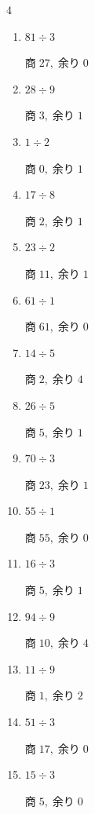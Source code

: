 \begin{multicols}{4}
\begin{enumerate}
        $商\; 1,\; 余り\; 8$

  \item $81 \div 3$

        $商\; 27,\; 余り\; 0$

  \item $28 \div 9$

        $商\; 3,\; 余り\; 1$

  \item $1 \div 2$

        $商\; 0,\; 余り\; 1$

  \item $17 \div 8$

        $商\; 2,\; 余り\; 1$

  \item $23 \div 2$

        $商\; 11,\; 余り\; 1$

  \item $61 \div 1$

        $商\; 61,\; 余り\; 0$

  \item $14 \div 5$

        $商\; 2,\; 余り\; 4$

  \item $26 \div 5$

        $商\; 5,\; 余り\; 1$

  \item $70 \div 3$

        $商\; 23,\; 余り\; 1$

  \item $55 \div 1$

        $商\; 55,\; 余り\; 0$

  \item $16 \div 3$

        $商\; 5,\; 余り\; 1$

  \item $94 \div 9$

        $商\; 10,\; 余り\; 4$

  \item $11 \div 9$

        $商\; 1,\; 余り\; 2$

  \item $51 \div 3$

        $商\; 17,\; 余り\; 0$

  \item $15 \div 3$

        $商\; 5,\; 余り\; 0$


\end{enumerate}
\end{multicols}
